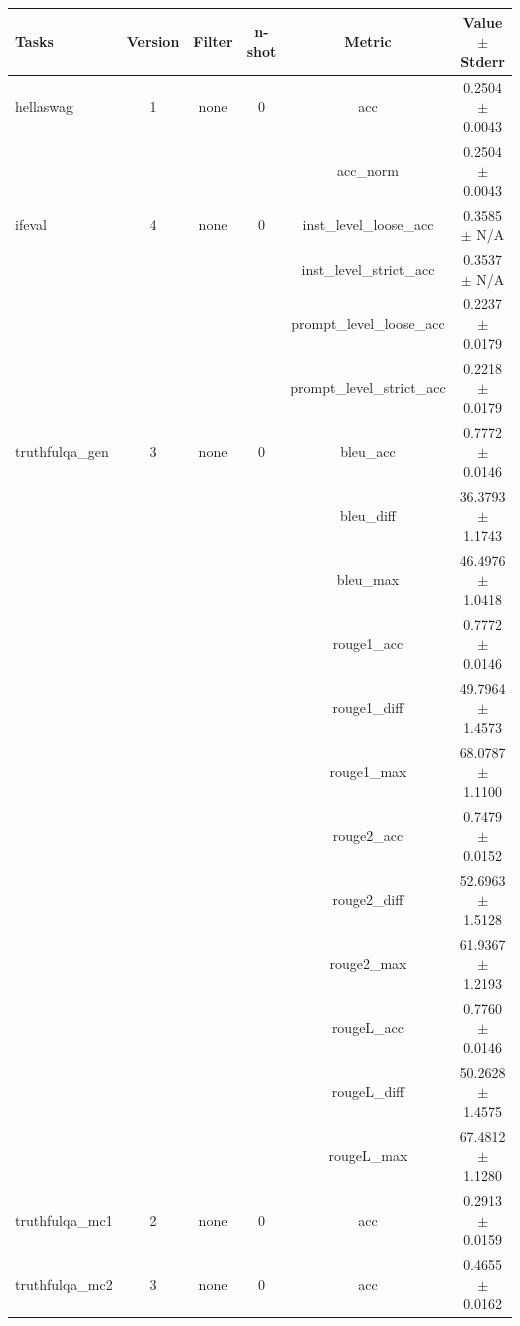 \documentclass{ifacconf}
\begin{document}
\begin{strip}
\begin{minipage}{\textwidth}
			\begin{table}[H]
				\centering
				\begin{tabular}{|l|c|c|c|c|c|}
					\hline
					\textbf{Tasks} & \textbf{Version} & \textbf{Filter} & \textbf{n-shot} & \textbf{Metric} & \textbf{Value} $\pm$ \textbf{Stderr} \\ \hline
					hellaswag & 1 & none & 0 & acc & 0.2504 $\pm$ 0.0043 \\ \hline
					& & & & acc\_norm & 0.2504 $\pm$ 0.0043 \\ \hline
					ifeval & 4 & none & 0 & inst\_level\_loose\_acc & 0.3585 $\pm$ N/A \\ \hline
					& & & & inst\_level\_strict\_acc & 0.3537 $\pm$ N/A \\ \hline
					& & & & prompt\_level\_loose\_acc & 0.2237 $\pm$ 0.0179 \\ \hline
					& & & & prompt\_level\_strict\_acc & 0.2218 $\pm$ 0.0179 \\ \hline
					truthfulqa\_gen & 3 & none & 0 & bleu\_acc & 0.7772 $\pm$ 0.0146 \\ \hline
					& & & & bleu\_diff & 36.3793 $\pm$ 1.1743 \\ \hline
					& & & & bleu\_max & 46.4976 $\pm$ 1.0418 \\ \hline
					& & & & rouge1\_acc & 0.7772 $\pm$ 0.0146 \\ \hline
					& & & & rouge1\_diff & 49.7964 $\pm$ 1.4573 \\ \hline
					& & & & rouge1\_max & 68.0787 $\pm$ 1.1100 \\ \hline
					& & & & rouge2\_acc & 0.7479 $\pm$ 0.0152 \\ \hline
					& & & & rouge2\_diff & 52.6963 $\pm$ 1.5128 \\ \hline
					& & & & rouge2\_max & 61.9367 $\pm$ 1.2193 \\ \hline
					& & & & rougeL\_acc & 0.7760 $\pm$ 0.0146 \\ \hline
					& & & & rougeL\_diff & 50.2628 $\pm$ 1.4575 \\ \hline
					& & & & rougeL\_max & 67.4812 $\pm$ 1.1280 \\ \hline
					truthfulqa\_mc1 & 2 & none & 0 & acc & 0.2913 $\pm$ 0.0159 \\ \hline
					truthfulqa\_mc2 & 3 & none & 0 & acc & 0.4655 $\pm$ 0.0162 \\ \hline
				\end{tabular}
				\label{tab:gemma2_q5km}
			\end{table}
		\end{minipage}
	\end{strip}
	
\end{document}

